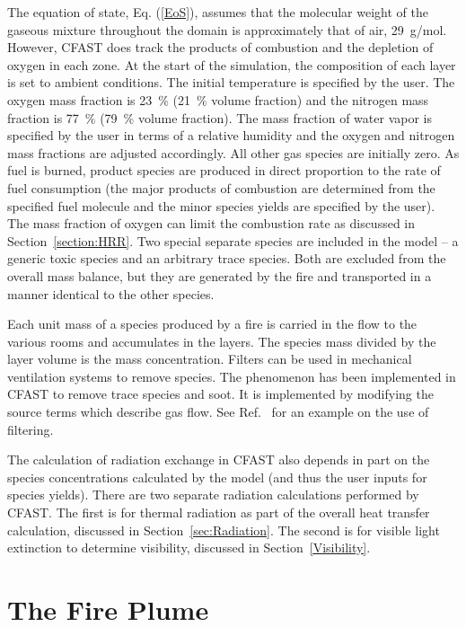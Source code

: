 \documentclass[12pt,twoside]{book}
\begin{document}
The equation of state, Eq. (\ref{EoS}), assumes that the molecular weight of the gaseous mixture throughout the domain is approximately that of air, 29~g/mol. However, CFAST does track the products of combustion and the depletion of oxygen in each zone. At the start of the simulation, the composition of each layer is set to ambient conditions. The initial temperature is specified by the user. The oxygen mass fraction is 23~\% (21~\% volume fraction) and the nitrogen mass fraction is 77~\% (79~\% volume fraction). The mass fraction of water vapor is specified by the user in terms of a relative humidity and the oxygen and nitrogen mass fractions are adjusted accordingly. All other gas species are initially zero.  As fuel is burned, product species are produced in direct proportion to the rate of fuel consumption (the major products of combustion are determined from the specified fuel molecule and the minor species yields are specified by the user). The mass fraction of oxygen can limit the combustion rate as discussed in Section~\ref{section:HRR}. Two special separate species are included in the model -- a generic toxic species and an arbitrary trace species. Both are excluded from the overall mass balance, but they are generated by the fire and transported in a manner identical to the other species.

Each unit mass of a species produced by a fire is carried in the flow to the various rooms and accumulates in the layers. The species mass divided by the layer volume is the mass concentration. Filters can be used in mechanical ventilation systems to remove species. The phenomenon has been implemented in CFAST to remove trace species and soot. It is implemented by modifying the source terms which describe gas flow. See Ref.~\cite{Jones:2008} for an example on the use of filtering.

The calculation of radiation exchange in CFAST also depends in part on the species concentrations calculated by the model (and thus the user inputs for species yields). There are two separate radiation calculations performed by CFAST. The first is for thermal radiation as part of the overall heat transfer calculation, discussed in Section~\ref{sec:Radiation}. The second is for visible light extinction to determine visibility, discussed in Section~\ref{Visibility}.

%
%

\chapter{The Fire Plume}
\label{sec:TheFire}
\end{document}
